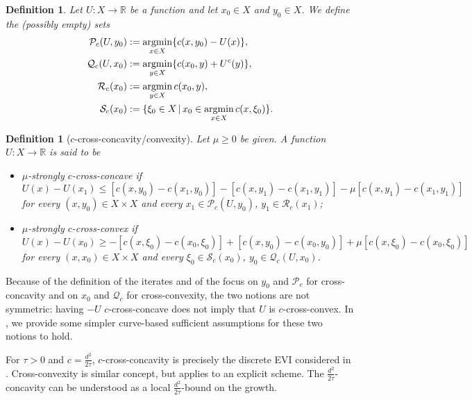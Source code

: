 \documentclass[reqno]{amsart}
\newcounter{results}[section]
\theoremstyle{plain}
\theoremstyle{remark}
\theoremstyle{plain}
\newtheorem{definition}[results]{Definition}
\numberwithin{equation}{section}
\theoremstyle{remark}
\newenvironment{continuance}[1]
  {\newcommand\continuanceref{\ref{#1}}\continuancex}
  {\endcontinuancex}
\newcommand{\R}{\mathbb{R}}
\newcommand{\argmin}{\mathop{\rm argmin}\limits}
\begin{document}
\begin{definition} Let $U:X \to \R$ be a function and let $x_0 \in X$ and $y_0 \in  X $. We define the (possibly empty) sets
\begin{align*}
\mathcal{P}_c(U,y_0)&:= \argmin_{x \in X} \{ c(x,y_0) - U(x) \} ,\\
\mathcal{Q}_c(U,x_0)&:= \argmin_{y \in  X } \{ c(x_0,y) +U^c(y) \}  ,\\
\mathcal{R}_c(x_0)&:= \argmin_{y \in  X } c(x_0,y)  ,\\
\mathcal{S}_c(x_0)&:=  \{\xi_0\in  X  \, | \, x_0\in\argmin_{x \in X} c(x,\xi_0) \} .
\end{align*}
\end{definition}

\begin{definition}[$c$-cross-concavity/convexity] Let $\mu\ge0$ be given. A function $U: X \to \R$ is said to be 
\begin{itemize}
\item \emph{$\mu$-strongly $c$-cross-concave} if 
\[ U(x)-U(x_1) \le \left [ c(x,y_0)-c(x_1, y_0)\right ] -  \left [ c(x,y_1)-c(x_1, y_1) \right ] -  \mu \left [ c(x,y_1)-c(x_1, y_1) \right ] \]
for every $(x,y_0) \in X\times  X $ and every $x_1 \in \mathcal{P}_c(U,y_0)$, $y_1 \in \mathcal{R}_c(x_1)$;
\item {\it $\mu$-strongly $c$-cross-convex} if 
 \[ U(x)-U(x_0) \ge -\left [ c(x,\xi_0)-c(x_0, \xi_0)\right ] +  \left [ c(x,y_0)-c(x_0, y_0) \right ] +  \mu \left [ c(x,\xi_0)-c(x_0, \xi_0) \right ] \]
 for every $(x,x_0) \in X \times X$ and every $\xi_0 \in \mathcal{S}_c(x_0)$, $y_0 \in \mathcal{Q}_c(U,x_0)$.
\end{itemize}
\end{definition}

Because of the definition of the iterates  and of  the focus on $y_0$ and $\mathcal{P}_c$ for cross-concavity and on $x_0$ and $\mathcal{Q}_c$ for cross-convexity, the two notions are  not symmetric: having $-U$ $c$-cross-concave does not imply that $U$ is $c$-cross-convex. In , we provide some simpler curve-based sufficient assumptions for these two notions to hold.

\begin{continuance}{ex:distance} For $\tau>0$ and $c=\frac{d^2}{2\tau}$, $c$-cross-concavity is precisely the discrete EVI considered in \cite[Corollary 4.1.3]{ags08}. Cross-convexity is similar  concept,  but applies to an explicit scheme. The $\frac{d^2}{2\tau}$-concavity can be understood as a  local  $\frac{d^2}{2\tau}$-bound on the  growth.
\end{continuance}
\end{document}
